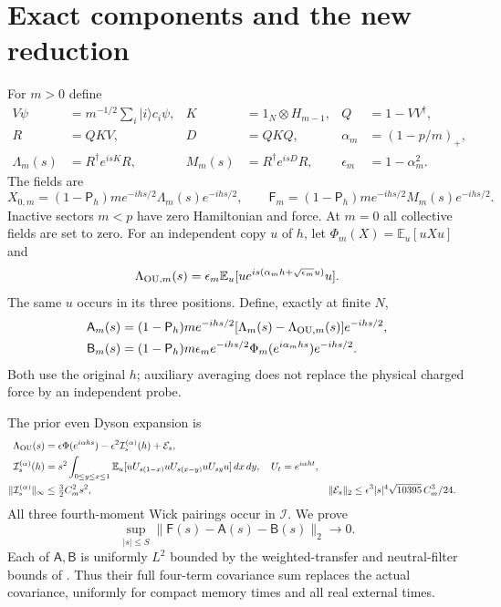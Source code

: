 \documentclass[11pt,a4paper]{article}
\newcommand{\EE}{\mathbb E}
\newcommand{\PP}{\mathsf P_h}
\newcommand{\AA}{\mathsf A}
\newcommand{\BB}{\mathsf B}
\newcommand{\FF}{\mathsf F}
\begin{document}
\section{Exact components and the new reduction}
For $m>0$ define
\begin{align}
 V\psi&=m^{-1/2}\sum_i|i\rangle c_i\psi,&
 K&=1_N\otimes H_{m-1},&Q&=1-VV^\dagger,\\
 R&=QKV,&D&=QKQ,&\alpha_m&=(1-p/m)_+,\\
 \Lambda_m(s)&=R^\dagger e^{isK}R,&
 M_m(s)&=R^\dagger e^{isD}R,&\epsilon_m&=1-\alpha_m^2.
\end{align}
The fields are
\begin{equation}
 X_{0,m}=(1-\PP)m e^{-ihs/2}\Lambda_m(s)e^{-ihs/2},\qquad
 \FF_m=(1-\PP)m e^{-ihs/2}M_m(s)e^{-ihs/2}.
\end{equation}
Inactive sectors $m<p$ have zero Hamiltonian and force. At $m=0$
all collective fields are set to zero.
For an independent copy $u$ of $h$, let $\Phi_m(X)=\EE_u[uXu]$ and
\begin{equation}
 \Lambda_{{\rm OU},m}(s)
 =\epsilon_m\EE_u[u e^{is(\alpha_mh+\sqrt{\epsilon_m}u)}u].
\end{equation}
The same $u$ occurs in its three positions. Define, exactly at finite $N$,
\begin{align}
 \AA_m(s)&=(1-\PP)m e^{-ihs/2}
          [\Lambda_m(s)-\Lambda_{{\rm OU},m}(s)]e^{-ihs/2},\\
 \BB_m(s)&=(1-\PP)m\epsilon_m e^{-ihs/2}
          \Phi_m(e^{i\alpha_mhs})e^{-ihs/2}.
\end{align}
Both use the original $h$; auxiliary averaging does not replace
the physical charged force by an independent probe.

The prior even Dyson expansion is
\begin{align}
 \Lambda_{\rm OU}(s)&=\epsilon\Phi(e^{i\alpha hs})
       -\epsilon^2\mathcal I_s^{(\alpha)}(h)+\mathcal E_s,\\
 \mathcal I_s^{(\alpha)}(h)&=s^2\int_{0\le y\le x\le1}
 \EE_u[uU_{s(1-x)}uU_{s(x-y)}uU_{sy}u]\,dx\,dy,
 \quad U_t=e^{i\alpha ht},\\
 \|\mathcal I_s^{(\alpha)}\|_\infty&\le\tfrac32 C_m^2s^2,
 &\|\mathcal E_s\|_2&\le
 \epsilon^3|s|^4\sqrt{10395}\,C_m^3/24.
\end{align}
All three fourth-moment Wick pairings occur in $\mathcal I$.
We prove
\begin{equation}
 \boxed{\quad\sup_{|s|\le S}\|\FF(s)-\AA(s)-\BB(s)\|_2\to0.\quad}
 \label{eq:reduction}
\end{equation}
Each of $\AA,\BB$ is uniformly $L^2$ bounded by the weighted-transfer
and neutral-filter bounds of \cite{Uniform}. Thus their full
four-term covariance sum replaces the actual covariance, uniformly
for compact memory times and all real external times.
\end{document}

